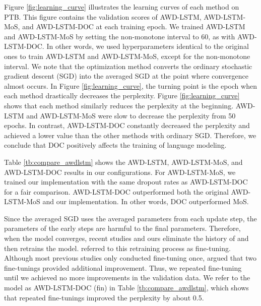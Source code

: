 \documentclass[11pt,a4paper]{article}
\begin{document}
Figure \ref{fig:learning_curve} illustrates the learning curves of each method on PTB.
This figure contains the validation scores of AWD-LSTM, AWD-LSTM-MoS, and AWD-LSTM-DOC at each training epoch.
We trained AWD-LSTM and AWD-LSTM-MoS by setting the non-monotone interval to 60, as with AWD-LSTM-DOC.
In other words, we used hyperparameters identical to the original ones to train AWD-LSTM and AWD-LSTM-MoS, except for the non-monotone interval.
We note that the optimization method converts the ordinary stochastic gradient descent (SGD) into the averaged SGD at the point where convergence almost occurs.
In Figure \ref{fig:learning_curve}, the turning point is the epoch when each method drastically decreases the perplexity.
Figure \ref{fig:learning_curve} shows that each method similarly reduces the perplexity at the beginning.
AWD-LSTM and AWD-LSTM-MoS were slow to decrease the perplexity from 50 epochs.
In contrast, AWD-LSTM-DOC constantly decreased the perplexity and achieved a lower value than the other methods with ordinary SGD.
Therefore, we conclude that DOC positively affects the training of language modeling.


Table \ref{tb:compare_awdlstm} shows the AWD-LSTM, AWD-LSTM-MoS, and AWD-LSTM-DOC results in our configurations.
For AWD-LSTM-MoS, we trained our implementation with the same dropout rates as AWD-LSTM-DOC for a fair comparison.
AWD-LSTM-DOC outperformed both the original AWD-LSTM-MoS and our implementation.
In other words, DOC outperformed MoS.



Since the averaged SGD uses the averaged parameters from each update step, the parameters of the early steps are harmful to the final parameters.
Therefore, when the model converges, recent studies and ours eliminate the history of and then retrains the model.
 referred to this retraining process as fine-tuning.
Although most previous studies only conducted fine-tuning once,  argued that two fine-tunings provided additional improvement.
Thus, we repeated fine-tuning until we achieved no more improvements in the validation data.
We refer to the model as AWD-LSTM-DOC (fin) in Table \ref{tb:compare_awdlstm}, which shows that repeated fine-tunings improved the perplexity by about 0.5.
\end{document}
